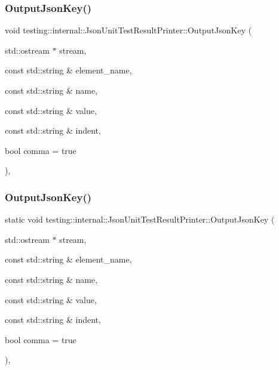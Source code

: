 \mbox{\label{classtesting_1_1internal_1_1_json_unit_test_result_printer_a63dcc481aba7d2305fad8ad9d4d8090c}} 
\subsubsection{\texorpdfstring{OutputJsonKey()}{OutputJsonKey()}\hspace{0.1cm}{\footnotesize\ttfamily [3/6]}}
{\footnotesize\ttfamily void testing\+::internal\+::\+Json\+Unit\+Test\+Result\+Printer\+::\+Output\+Json\+Key (\begin{DoxyParamCaption}\item[{std\+::ostream $\ast$}]{stream,  }\item[{const std\+::string \&}]{element\+\_\+name,  }\item[{const std\+::string \&}]{name,  }\item[{const std\+::string \&}]{value,  }\item[{const std\+::string \&}]{indent,  }\item[{bool}]{comma = {\ttfamily true} }\end{DoxyParamCaption})\hspace{0.3cm}{\ttfamily [static]}, {\ttfamily [private]}}

\mbox{\label{classtesting_1_1internal_1_1_json_unit_test_result_printer_a78cedc9b8afd033a90cd921f65a0f4c5}} 
\subsubsection{\texorpdfstring{OutputJsonKey()}{OutputJsonKey()}\hspace{0.1cm}{\footnotesize\ttfamily [4/6]}}
{\footnotesize\ttfamily static void testing\+::internal\+::\+Json\+Unit\+Test\+Result\+Printer\+::\+Output\+Json\+Key (\begin{DoxyParamCaption}\item[{std\+::ostream $\ast$}]{stream,  }\item[{const std\+::string \&}]{element\+\_\+name,  }\item[{const std\+::string \&}]{name,  }\item[{const std\+::string \&}]{value,  }\item[{const std\+::string \&}]{indent,  }\item[{bool}]{comma = {\ttfamily true} }\end{DoxyParamCaption})\hspace{0.3cm}{\ttfamily [static]}, {\ttfamily [private]}}

